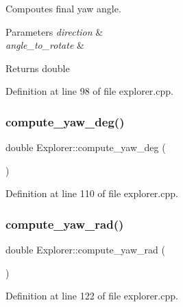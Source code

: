Compoutes final yaw angle. 


\begin{DoxyParams}{Parameters}
{\em direction} & \\
\hline
{\em angle\+\_\+to\+\_\+rotate} & \\
\hline
\end{DoxyParams}
\begin{DoxyReturn}{Returns}
double 
\end{DoxyReturn}


Definition at line 98 of file explorer.\+cpp.

\mbox{\label{class_explorer_a670cdffdb8c3173c300590cfc45ab6d2}} 
\subsubsection{\texorpdfstring{compute\+\_\+yaw\+\_\+deg()}{compute\_yaw\_deg()}}
{\footnotesize\ttfamily double Explorer\+::compute\+\_\+yaw\+\_\+deg (\begin{DoxyParamCaption}{ }\end{DoxyParamCaption})}



Definition at line 110 of file explorer.\+cpp.

\mbox{\label{class_explorer_ac5b91cd64189a60ffe62535cb5bc093a}} 
\subsubsection{\texorpdfstring{compute\+\_\+yaw\+\_\+rad()}{compute\_yaw\_rad()}}
{\footnotesize\ttfamily double Explorer\+::compute\+\_\+yaw\+\_\+rad (\begin{DoxyParamCaption}{ }\end{DoxyParamCaption})}



Definition at line 122 of file explorer.\+cpp.

\mbox{\label{class_explorer_ac3a5c9368647dd9d2c36d12497bd889e}} 
